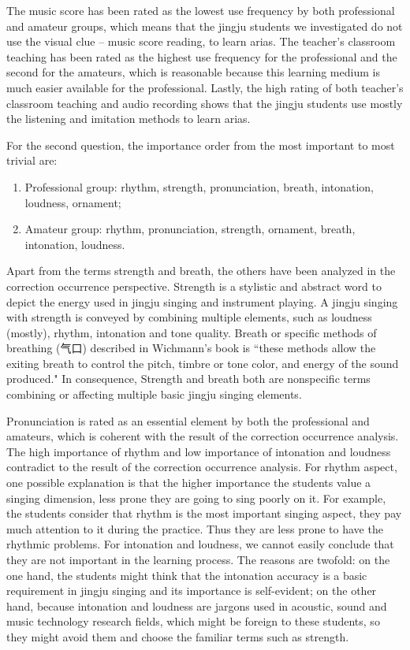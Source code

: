 The music score has been rated as the lowest use frequency by both professional and amateur groups, which means that the jingju students we investigated do not use the visual clue -- music score reading, to learn arias. The teacher's classroom teaching has been rated as the highest use frequency for the professional and the second for the amateurs, which is reasonable because this learning medium is much easier available for the professional. Lastly, the high rating of both teacher's classroom teaching and audio recording shows that the jingju students use mostly the listening and imitation methods to learn arias.

For the second question, the importance order from the most important to most trivial are: 

\begin{enumerate}[noitemsep]
\item Professional group: rhythm, strength, pronunciation, breath, intonation, loudness, ornament; 
\item Amateur group: rhythm, pronunciation, strength, ornament, breath, intonation, loudness. 
\end{enumerate}

Apart from the terms strength and breath, the others have been analyzed in the correction occurrence perspective. Strength is a stylistic and abstract word to depict the energy used in jingju singing and instrument playing. A jingju singing with strength is conveyed by combining multiple elements, such as loudness (mostly), rhythm, intonation and tone quality. Breath or specific methods of breathing (气口) described in Wichmann's book \cite{Wichmann1991a} is ``these methods allow the exiting breath to control the pitch, timbre or tone color, and energy of the sound produced." In consequence, Strength and breath both are nonspecific terms combining or affecting multiple basic jingju singing elements.

Pronunciation is rated as an essential element by both the professional and amateurs, which is coherent with the result of the correction occurrence analysis. The high importance of rhythm and low importance of intonation and loudness contradict to the result of the correction occurrence analysis. For rhythm aspect, one possible explanation is that the higher importance the students value a singing dimension, less prone they are going to sing poorly on it. For example, the students consider that rhythm is the most important singing aspect, they pay much attention to it during the practice. Thus they are less prone to have the rhythmic problems. For intonation and loudness, we cannot easily conclude that they are not important in the learning process. The reasons are twofold: on the one hand, the students might think that the intonation accuracy is a basic requirement in jingju singing and its importance is self-evident; on the other hand, because intonation and loudness are jargons used in acoustic, sound and music technology research fields, which might be foreign to these students, so they might avoid them and choose the familiar terms such as strength.

